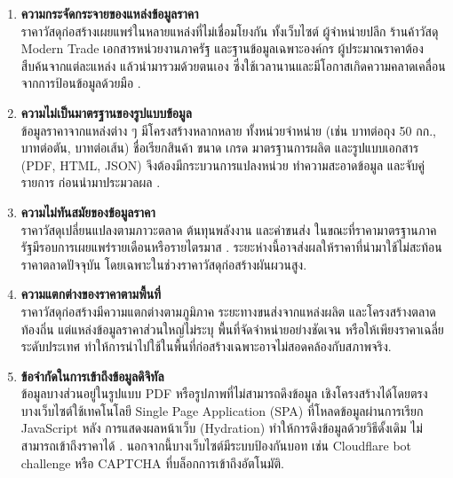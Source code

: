 \begin{enumerate}[leftmargin=2em,itemsep=0.4em]
  \item \textbf{ความกระจัดกระจายของแหล่งข้อมูลราคา}\\
        ราคาวัสดุก่อสร้างเผยแพร่ในหลายแหล่งที่ไม่เชื่อมโยงกัน ทั้งเว็บไซต์
        ผู้จำหน่ายปลีก ร้านค้าวัสดุ Modern Trade เอกสารหน่วยงานภาครัฐ
        และฐานข้อมูลเฉพาะองค์กร ผู้ประมาณราคาต้องสืบค้นจากแต่ละแหล่ง
        แล้วนำมารวมด้วยตนเอง ซึ่งใช้เวลานานและมีโอกาสเกิดความคลาดเคลื่อน
        จากการป้อนข้อมูลด้วยมือ \cite{rao2015}.

  \item \textbf{ความไม่เป็นมาตรฐานของรูปแบบข้อมูล}\\
        ข้อมูลราคาจากแหล่งต่าง ๆ มีโครงสร้างหลากหลาย ทั้งหน่วยจำหน่าย
        (เช่น บาทต่อถุง 50 กก., บาทต่อตัน, บาทต่อเส้น) ชื่อเรียกสินค้า
        ขนาด เกรด มาตรฐานการผลิต และรูปแบบเอกสาร (PDF, HTML, JSON)
        จึงต้องมีกระบวนการแปลงหน่วย ทำความสะอาดข้อมูล และจับคู่รายการ
        ก่อนนำมาประมวลผล \cite{chunyaem2019}.

  \item \textbf{ความไม่ทันสมัยของข้อมูลราคา}\\
        ราคาวัสดุเปลี่ยนแปลงตามภาวะตลาด ต้นทุนพลังงาน และค่าขนส่ง
        ในขณะที่ราคามาตรฐานภาครัฐมีรอบการเผยแพร่รายเดือนหรือรายไตรมาส
        \cite{tpso2569}. ระยะห่างนี้อาจส่งผลให้ราคาที่นำมาใช้ไม่สะท้อน
        ราคาตลาดปัจจุบัน โดยเฉพาะในช่วงราคาวัสดุก่อสร้างผันผวนสูง.

  \item \textbf{ความแตกต่างของราคาตามพื้นที่}\\
        ราคาวัสดุก่อสร้างมีความแตกต่างตามภูมิภาค ระยะทางขนส่งจากแหล่งผลิต
        และโครงสร้างตลาดท้องถิ่น แต่แหล่งข้อมูลราคาส่วนใหญ่ไม่ระบุ
        พื้นที่จัดจำหน่ายอย่างชัดเจน หรือให้เพียงราคาเฉลี่ยระดับประเทศ
        ทำให้การนำไปใช้ในพื้นที่ก่อสร้างเฉพาะอาจไม่สอดคล้องกับสภาพจริง.

  \item \textbf{ข้อจำกัดในการเข้าถึงข้อมูลดิจิทัล}\\
        ข้อมูลบางส่วนอยู่ในรูปแบบ PDF หรือรูปภาพที่ไม่สามารถดึงข้อมูล
        เชิงโครงสร้างได้โดยตรง บางเว็บไซต์ใช้เทคโนโลยี Single Page
        Application (SPA) ที่โหลดข้อมูลผ่านการเรียก JavaScript หลัง
        การแสดงผลหน้าเว็บ (Hydration) ทำให้การดึงข้อมูลด้วยวิธีดั้งเดิม
        ไม่สามารถเข้าถึงราคาได้
        \cite{rao2015}. นอกจากนี้บางเว็บไซต์มีระบบป้องกันบอท เช่น
        Cloudflare bot challenge หรือ CAPTCHA ที่บล็อกการเข้าถึงอัตโนมัติ.


\end{enumerate}
